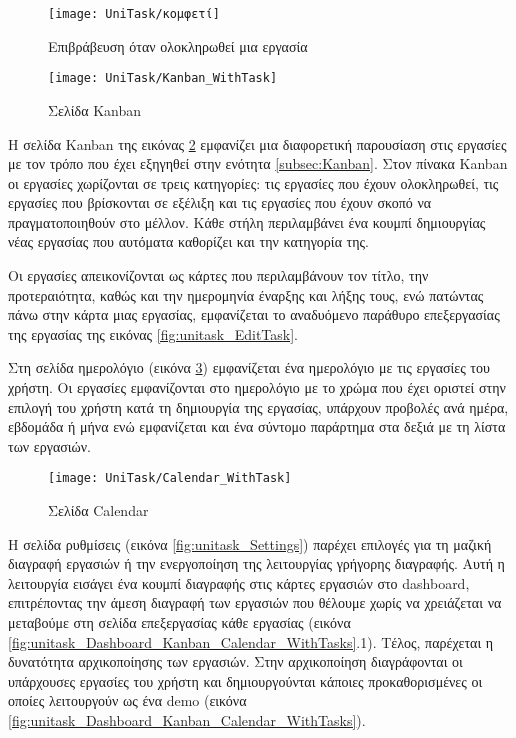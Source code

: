         \begin{figure}[h!] \noindent \centering
            \texttt{[image: UniTask/κομφετί]}
            \caption{\centering Επιβράβευση όταν ολοκληρωθεί μια εργασία}
            \label{fig:unitask_confetti}
        \end{figure}

        \begin{figure}[h!] \noindent \centering
            \texttt{[image: UniTask/Kanban\_WithTask]}
            \caption{\centering Σελίδα Kanban}
            \label{fig:unitask_Kanban_WithTask}
        \end{figure}

        Η σελίδα {\ZonaSB Kanban} της εικόνας \ref{fig:unitask_Kanban_WithTask} εμφανίζει μια διαφορετική παρουσίαση στις εργασίες με τον τρόπο που έχει εξηγηθεί στην ενότητα \ref{subsec:Kanban}. Στον πίνακα Kanban οι εργασίες χωρίζονται σε τρεις κατηγορίες: τις εργασίες που έχουν ολοκληρωθεί, τις εργασίες που βρίσκονται σε εξέλιξη και τις εργασίες που έχουν σκοπό να πραγματοποιηθούν στο μέλλον. Κάθε στήλη περιλαμβάνει ένα κουμπί δημιουργίας νέας εργασίας που αυτόματα καθορίζει και την κατηγορία της.

        Οι εργασίες απεικονίζονται ως κάρτες που περιλαμβάνουν τον τίτλο, την προτεραιότητα, καθώς και την ημερομηνία έναρξης και λήξης τους, ενώ πατώντας πάνω στην κάρτα μιας εργασίας, εμφανίζεται το αναδυόμενο παράθυρο επεξεργασίας της εργασίας της εικόνας \ref{fig:unitask_EditTask}.

        Στη σελίδα {\ZonaSB ημερολόγιο} (εικόνα \ref{fig:unitask_Calendar_WithTask}) εμφανίζεται ένα ημερολόγιο με τις εργασίες του χρήστη. Οι εργασίες εμφανίζονται στο ημερολόγιο με το χρώμα που έχει οριστεί στην επιλογή του χρήστη κατά τη δημιουργία της εργασίας, υπάρχουν προβολές ανά ημέρα, εβδομάδα ή μήνα ενώ εμφανίζεται και ένα σύντομο παράρτημα στα δεξιά με τη λίστα των εργασιών.

        \begin{figure}[h!] \noindent \centering
            \texttt{[image: UniTask/Calendar\_WithTask]}
            \caption{\centering Σελίδα Calendar}
            \label{fig:unitask_Calendar_WithTask}
        \end{figure}

        Η σελίδα {\ZonaSB ρυθμίσεις} (εικόνα \ref{fig:unitask_Settings}) παρέχει επιλογές για τη μαζική διαγραφή εργασιών ή την ενεργοποίηση της λειτουργίας γρήγορης διαγραφής. Αυτή η λειτουργία εισάγει ένα κουμπί διαγραφής στις κάρτες εργασιών στο dashboard, επιτρέποντας την άμεση διαγραφή των εργασιών που θέλουμε χωρίς να χρειάζεται να μεταβούμε στη σελίδα επεξεργασίας κάθε εργασίας (εικόνα \ref{fig:unitask_Dashboard_Kanban_Calendar_WithTasks}.1). Τέλος, παρέχεται η δυνατότητα αρχικοποίησης των εργασιών. Στην αρχικοποίηση διαγράφονται οι υπάρχουσες εργασίες του χρήστη και δημιουργούνται κάποιες προκαθορισμένες οι οποίες λειτουργούν ως ένα demo (εικόνα \ref{fig:unitask_Dashboard_Kanban_Calendar_WithTasks}).

